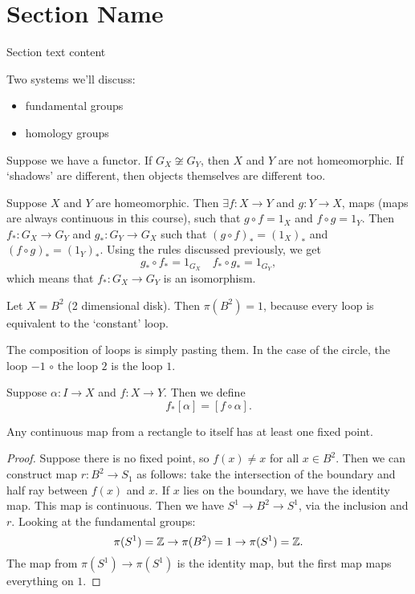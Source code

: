 \setcounter{section}{0}
\section{Section Name}
Section text content

Two systems we'll discuss:
\begin{itemize}
    \item fundamental groups
    \item homology groups
\end{itemize}


\begin{eg}
    Suppose we have a functor.
    If $G_X \not\cong G_Y$, then  $X$ and  $Y$ are not homeomorphic.
    If `shadows' are different, then objects themselves are different too.
\end{eg}
\begin{explanation}
    Suppose $X$ and $Y$ are homeomorphic.
    Then $\exists f: X \to  Y$ and $g: Y \to  X$, maps (maps are always continuous in this course), such that $g  \circ f = 1_X$ and $f \circ g = 1_Y$.
    Then $f_*: G_X \to G_Y$ and $g_*: G_Y \to  G_X$ such that $(g \circ f)_* = (1_X)_*$ and  $(f \circ g)_* = (1_Y)_*$. Using the rules discussed previously, we get
    \[
    g_*  \circ f_* = 1_{G_X} \quad f_*  \circ  g_* = 1_{G_Y}
    ,\] 
    which means that $f_* : G_X \to  G_Y$ is an isomorphism.
\end{explanation}

\begin{eg}
    Let $X = B^2$ (2 dimensional disk).
    Then $\pi(B^2) = 1$, because every loop is equivalent to the `constant' loop.
\end{eg}

The composition of loops is simply pasting them.
In the case of the circle, the loop $-1$  $\circ$ the loop  $2$ is the loop $1$.

Suppose $\alpha: I \to  X$ and $f : X\to Y$. Then we define 
\[
    f_*[\alpha] = [f \circ \alpha]
.\] 


\begin{theorem}
    Any continuous map from a rectangle to itself has at least one fixed point.
\end{theorem}
\begin{proof}
    Suppose there is no fixed point, so $f(x) \neq x$ for all  $x \in B^2$.
    Then we can construct map $r : B^2 \to  S_1$ as follows:
    take the intersection of the boundary and half ray between $f(x)$ and $x$.
    If $x$ lies on the boundary, we have the identity map.
    This map is continuous.
    Then we have $S^1 \to B^2 \to S^1$, via the inclusion and $r$.
    Looking at the fundamental groups:
    \[
        \pi(S^1)  =\mathbb{Z} \to  \pi(B^2) = 1 \to  \pi(S^1) = \mathbb{Z}
    .\] 
    The map from $\pi(S^1) \to  \pi(S^{1})$ is the identity map, but the first map maps everything on $1$. \phantom\qedhere\hfill\contra 
\end{proof}

